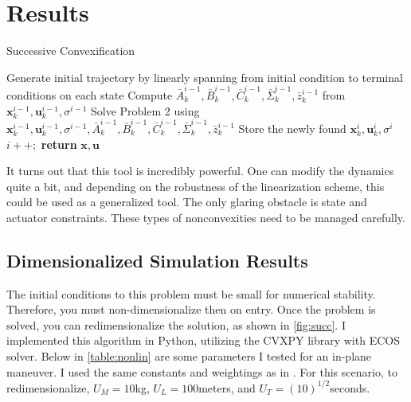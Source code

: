 \chapter{Results}
\label{results}


\begin{algorithm}
\caption{Successive Convexification}\label{Successive}
\begin{algorithmic}[1]
\State Generate initial trajectory by linearly spanning from initial condition to terminal conditions on each state
\State Compute $\bar{A}_k^{i-1}, \bar{B}_k^{i-1}, \bar{C}_k^{i-1}, \bar{\Sigma}_k^{i-1}, \bar{z}_k^{i-1}$ from $\mathbf{x}_k^{i-1}, \mathbf{u}_k^{i-1}, \sigma^{i-1}$
\State Solve Problem 2 using $\mathbf{x}_k^{i-1}, \mathbf{u}_k^{i-1}, \sigma^{i-1}, \bar{A}_k^{i-1}, \bar{B}_k^{i-1}, \bar{C}_k^{i-1}, \bar{\Sigma}_k^{i-1}, \bar{z}_k^{i-1}$
\State Store the newly found $\mathbf{x}_k^{i}, \mathbf{u}_k^{i}, \sigma^{i}$
\State $i++;$
\EndWhile 
\State \textbf{return} $\mathbf{x}, \mathbf{u}$
\EndProcedure
\end{algorithmic}
\end{algorithm}



It turns out that this tool is incredibly powerful. One can modify the dynamics quite a bit, and depending on the robustness of the linearization scheme, this could be used as a generalized tool. The only glaring obstacle is state and actuator constraints. These types of nonconvexities need to be managed carefully.



\section{Dimensionalized Simulation Results}
The initial conditions to this problem must be small for numerical stability. Therefore, you must non-dimensionalize then on entry. Once the problem is solved, you can redimensionalize the solution, as shown in \ref{fig:succ}. I implemented this algorithm in Python, utilizing the CVXPY library with ECOS solver. Below in \ref{table:nonlin} are some parameters I tested for an in-plane maneuver. I used the same constants and weightings as in \cite{6dofsucc}. For this scenario, to redimensionalize, $U_M = 10$kg, $U_L=100$meters, and $U_T = (10)^{1/2}$seconds.

